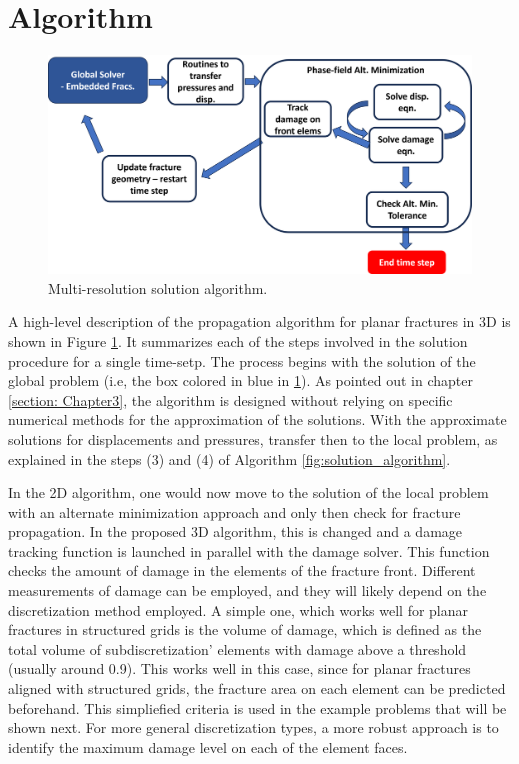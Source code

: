 \section{Algorithm}
\label{section: Chapter4/algo}

\begin{figure}[h]
    \centering
    \includegraphics[width=\linewidth]{Chapter4/figures/planar3D_algorithm.png}
    \caption{Multi-resolution solution algorithm.}
    \label{fig:MR_planar_algo}
\end{figure}

A high-level description of the propagation algorithm for planar fractures in 3D is shown in Figure \ref{fig:MR_planar_algo}. It summarizes each of the steps involved in the solution procedure for a single time-setp. The process begins with the solution of the global problem (i.e, the box colored in blue in \ref{fig:MR_planar_algo}). As pointed out in chapter \ref{section: Chapter3}, the algorithm is designed without relying on specific numerical methods for the approximation of the solutions. With the approximate solutions for displacements and pressures, transfer then to the local problem, as explained in the steps (3) and (4) of Algorithm \ref{fig:solution_algorithm}.

In the 2D algorithm, one would now move to the solution of the local problem with an alternate minimization approach and only then check for fracture propagation. In the proposed 3D algorithm, this is changed and a damage tracking function is launched in parallel with the damage solver. This function checks the amount of damage in the elements of the fracture front. Different measurements of damage can be employed, and they will likely depend on the discretization method employed. A simple one, which works well for planar fractures in structured grids is the volume of damage, which is defined as the total volume of subdiscretization' elements with damage above a threshold (usually around 0.9). This works well in this case, since for planar fractures aligned with structured grids, the fracture area on each element can be predicted beforehand. This simpliefied criteria is used in the example problems that will be shown next. For more general discretization types, a more robust approach is to identify the maximum damage level on each of the element faces. 

